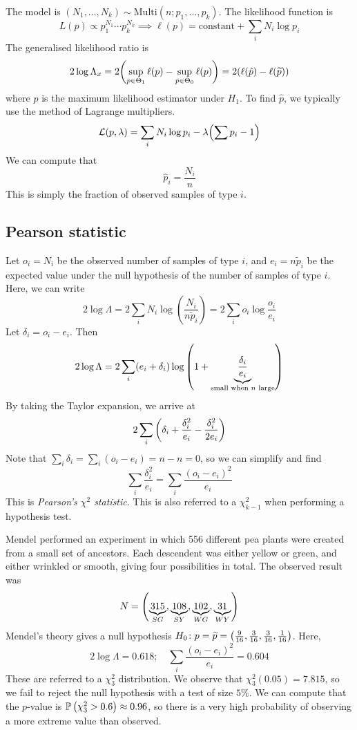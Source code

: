 The model is \( (N_1, \dots, N_k) \sim \mathrm{Multi}(n; p_1, \dots, p_k) \).
The likelihood function is
\[
	L(p) \propto p_1^{N_1} \cdots p_k^{N_k} \implies \ell(p) = \text{constant} + \sum_i N_i \log p_i
\]
The generalised likelihood ratio is
\[
	2 \log \Lambda_x = 2\qty(\sup_{p \in \Theta_1} \ell(p) - \sup_{p \in \Theta_0} \ell(p)) = 2\qty(\ell(\hat p) - \ell(\widetilde p))
\]
where \( \hat p \) is the maximum likelihood estimator under \( H_1 \).
To find \( \hat p \), we typically use the method of Lagrange multipliers.
\[
	\mathcal L(p, \lambda) = \sum_i N_i \log p_i - \lambda \qty(\sum p_i - 1)
\]
We can compute that
\[
	\hat p_i = \frac{N_i}{n}
\]
This is simply the fraction of observed samples of type \( i \).

\subsection{Pearson statistic}
Let \( o_i = N_i \) be the observed number of samples of type \( i \), and \( e_i = n \widetilde p_i \) be the expected value under the null hypothesis of the number of samples of type \( i \).
Here, we can write
\[
	2 \log \Lambda = 2 \sum_i N_i \log(\frac{N_i}{n \widetilde p_i}) = 2 \sum_i o_i \log \frac{o_i}{e_i}
\]
Let \( \delta_i = o_i - e_i \).
Then
\[
	2 \log \Lambda = 2 \sum_i (e_i + \delta_i) \log\qty(1 + \underbrace{\frac{\delta_i}{e_i}}_{\text{small when } n \text{ large}})
\]
By taking the Taylor expansion, we arrive at
\[
	2 \sum_i \qty(\delta_i + \frac{\delta_i^2}{e_i} - \frac{\delta_i^2}{2e_i})
\]
Note that \( \sum_i \delta_i = \sum_i (o_i - e_i) = n - n = 0 \), so we can simplify and find
\[
	\sum_i \frac{\delta_i^2}{e_i} = \sum_i \frac{(o_i - e_i)^2}{e_i}
\]
This is \textit{Pearson's \( \chi^2 \) statistic}.
This is also referred to a \( \chi^2_{k-1} \) when performing a hypothesis test.
\begin{example}
	Mendel performed an experiment in which 556 different pea plants were created from a small set of ancestors.
	Each descendent was either yellow or green, and either wrinkled or smooth, giving four possibilities in total.
	The observed result was
	\[
		N = \qty(\underbrace{315}_{SG}, \underbrace{108}_{SY}, \underbrace{102}_{WG}, \underbrace{31}_{WY})
	\]
	Mendel's theory gives a null hypothesis \( H_0 \colon p = \widetilde p = \qty(\frac{9}{16}, \frac{3}{16}, \frac{3}{16}, \frac{1}{16}) \).
	Here,
	\[
		2 \log \Lambda = 0.618;\quad \sum_i \frac{(o_i - e_i)^2}{e_i} = 0.604
	\]
	These are referred to a \( \chi^2_3 \) distribution.
	We observe that \( \chi^2_3(0.05) = 7.815 \), so we fail to reject the null hypothesis with a test of size \( 5\% \).
	We can compute that the \( p \)-value is \( \mathbb{P}\left({\chi^2_3 > 0.6}\right) \approx 0.96 \), so there is a very high probability of observing a more extreme value than observed.
\end{example}

